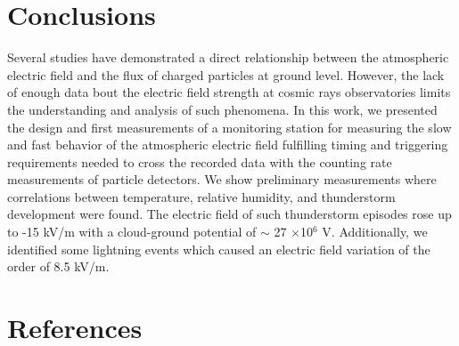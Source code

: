\documentclass[a4paper]{jpconf}
\begin{document}
\section{Conclusions}

Several studies have demonstrated a direct relationship between the atmospheric electric field and the flux of charged particles at ground level. However, the lack of enough data bout the electric field strength at cosmic rays observatories limits the understanding and analysis of such phenomena. In this work, we presented the design and first measurements of a monitoring station for measuring the slow and fast behavior of the atmospheric electric field fulfilling timing and triggering requirements needed to cross the recorded data with the counting rate measurements of particle detectors.
We show preliminary measurements where correlations between temperature, relative humidity, and thunderstorm development were found. The electric field of such thunderstorm episodes rose up to -15 kV/m with a cloud-ground potential of $\sim$ 27 $\times$10$^6$ V. Additionally, we identified some lightning events which caused an electric field variation of the order of 8.5 kV/m.

\section*{References}



\end{document}
